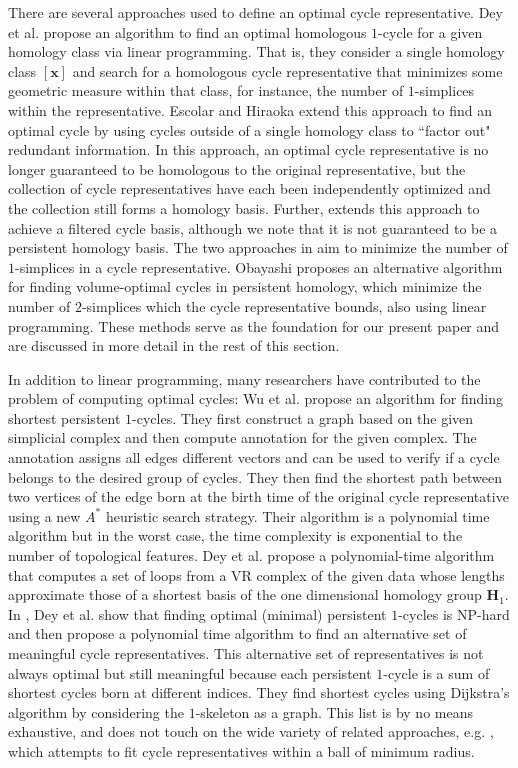 \documentclass[utf8]{formatting_stuff/frontiersFPHY}
\newcommand{\Homologies}[0]{\mathbf{H}}
\newcommand{\optimalrep}{\mathbf{x}}
\theoremstyle{plain}
\theoremstyle{definition}
\begin{document}
 
There are several approaches used to define an optimal cycle representative. Dey et al. \cite{dey2011optimal} propose an algorithm to find an optimal homologous $1$-cycle for a given homology class via linear programming. That is, they consider a single homology class $[\optimalrep]$ and search for a homologous cycle representative that minimizes some geometric measure within that class, for instance, the number of $1$-simplices within the representative. Escolar and Hiraoka \cite{Escolar2016} extend this approach to find an optimal cycle by using cycles outside of a single homology class to ``factor out" redundant information. In this approach, an optimal cycle representative is no longer guaranteed to be homologous to the original representative, but the collection of cycle representatives have each been independently optimized and the collection still forms a homology basis. Further, \cite{Escolar2016} extends this approach to achieve a filtered cycle basis, although we note that it is not guaranteed to be a persistent homology basis. The two approaches in \cite{dey2011optimal,Escolar2016} aim to minimize the number of $1$-simplices in a cycle representative. Obayashi \cite{Obayashi2018} proposes an alternative algorithm for finding volume-optimal cycles in persistent homology, which minimize the number of $2$-simplices which the cycle representative bounds, also using linear programming. These methods serve as the foundation for our present paper and are discussed in more detail in the rest of this section.  




In addition to linear programming, many researchers have contributed to the problem of computing optimal cycles: Wu et al. \cite{wu} propose an algorithm for finding shortest persistent $1$-cycles. They first construct a graph based on the given simplicial complex and then compute annotation for the given complex. The annotation assigns all edges different vectors and can be used to verify if a cycle belongs to the desired group of cycles. They then find the shortest path between two vertices of the edge born at the birth time of the original cycle representative using a new $A^*$ heuristic search strategy. Their algorithm is a polynomial time algorithm but in the worst case, the time complexity is exponential to the number of topological features. Dey et al. \cite{shortestonedimension} propose a polynomial-time algorithm that computes a set of loops from a VR complex of the given data whose lengths approximate those of a shortest basis of the one dimensional homology group $\Homologies_1$. In \cite{dey2018}, Dey et al. show that finding optimal (minimal) persistent $1$-cycles is NP-hard and then propose a polynomial time algorithm to find an alternative set of meaningful cycle representatives. This alternative set of representatives is not always optimal but still meaningful because each persistent $1$-cycle is a sum of shortest cycles born at different indices. They find shortest cycles using Dijkstra's algorithm by considering the $1$-skeleton as a graph.   This list is by no means exhaustive, and does not touch on the wide variety of related approaches, e.g. \cite{chenhardness}, which attempts to fit cycle representatives within a ball of minimum radius.
\end{document}
